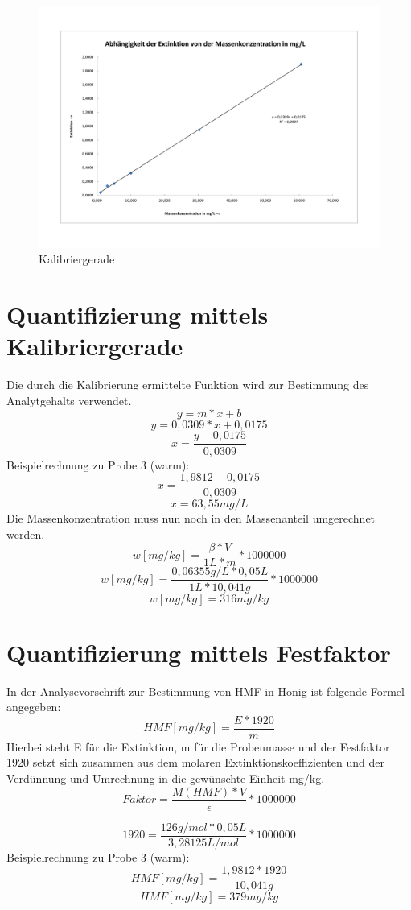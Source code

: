 \begin{figure}[htbp]
	\centering
		\includegraphics[width=1.00\textwidth]{../Bilder/DiagrammKalibrierung.pdf}
	\caption{Kalibriergerade}
	\label{fig:DiagrammKalibrierung}
\end{figure}

\section{Quantifizierung mittels Kalibriergerade}
Die durch die Kalibrierung ermittelte Funktion wird zur Bestimmung des Analytgehalts verwendet.
	\[y=m*x+b\]
	\[y=0,0309*x+0,0175\]
	\[x=\frac{ y-0,0175 }{ 0,0309 }\]
Beispielrechnung zu Probe 3 (warm):
	\[x=\frac{ 1,9812-0,0175 }{ 0,0309 }\]
	\[x=63,55mg/L\]
Die Massenkonzentration muss nun noch in den Massenanteil umgerechnet werden.
	\[w[mg/kg]=\frac{ \beta*V }{ 1L * m }*1000000\]
	\[w[mg/kg]=\frac{ 0,06355g/L*0,05L }{ 1L * 10,041g }*1000000\]
	\[w[mg/kg]=316mg/kg\]

	
\section{Quantifizierung mittels Festfaktor}
In der Analysevorschrift zur Bestimmung von HMF in Honig ist folgende Formel angegeben:
	\[HMF[mg/kg]=\frac{ E * 1920 }{ m }\]
Hierbei steht E für die Extinktion, m für die Probenmasse und der Festfaktor 1920 setzt sich zusammen aus dem molaren Extinktionskoeffizienten und der Verdünnung und Umrechnung in die gewünschte Einheit mg/kg.
	\[Faktor=\frac{ M(HMF)*V }{ \epsilon }*1000000\]
	
	\[1920=\frac{ 126g/mol * 0,05L }{ 3,28125L/mol }*1000000\]
Beispielrechnung zu Probe 3 (warm):
	\[HMF[mg/kg]=\frac{ 1,9812 * 1920 }{ 10,041g }\]
	\[HMF[mg/kg]=379mg/kg\]
